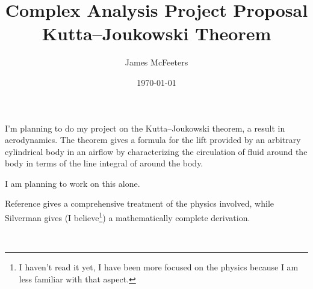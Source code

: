 \documentclass[letterpaper]{article}
\title{Complex Analysis Project Proposal\\Kutta--Joukowski Theorem}
\author{James McFeeters}
\date{\today}
\begin{document}
	\maketitle

	I'm planning to do my project on the Kutta--Joukowski theorem, a result in aerodynamics.
	The theorem gives a formula for the lift provided by an arbitrary cylindrical body in an airflow by characterizing the circulation of fluid around the body in terms of the line integral of around the body.

	I am planning to work on this alone.

	Reference \cite{anderson} gives a comprehensive treatment of the physics involved, while Silverman \cite{book:293373} gives (I believe\footnote{I haven't read it yet, I have been more focused on the physics because I am less familiar with that aspect.}) a mathematically complete derivation.

	~\\[2 em]

\nocite{*}


\end{document}
